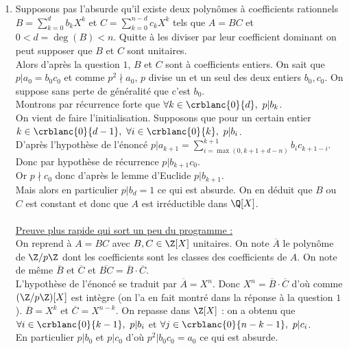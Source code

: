 \documentclass{book}
\begin{document}
\begin{enumerate}[leftmargin=*]
\begin{enumerate}[label=\alph*.]
			On sait que $\tilde P\tilde Q=\displaystyle\frac{a}{c(aP)}\cdot\frac{b}{c(bQ)}S$. On remarque que le contenu de $S$ vaut $1$ car il est unitaire. Donc en passant au contenu, $\displaystyle 1=c(\tilde P)c(\tilde Q)=\frac{a}{c(aP)}\cdot\frac{b}{c(bQ)}$. De plus $\displaystyle\frac{a}{c(aP)}$ et $\displaystyle\frac{b}{c(bQ)}$ sont des entiers. Ils valent donc tous les deux $\pm1$. Ainsi $P=\pm\tilde P\in \Z[X]$ et $Q=\pm\tilde Q\in \Z[X]$.
		\end{enumerate}
		\item Supposons pas l'absurde qu'il existe deux polynômes à coefficients rationnels $B=\displaystyle\sum_{k=0}^db_kX^k$ et $C=\displaystyle\sum_{k=0}^{n-d}c_kX^k$ tels que $A=BC$ et $0<d=\deg(B)<n$. Quitte à les diviser par leur coefficient dominant on peut supposer que $B$ et $C$ sont unitaires.\\
		Alors d'après la question $1$, $B$ et $C$ sont à coefficients entiers.
		On sait que $p|a_0=b_0c_0$ et comme $p^2\nmid a_0$, $p$ divise un et un seul des deux entiers $b_0,c_0$. On suppose sans perte de généralité que c'est $b_0$.\\
		Montrons par récurrence forte que $\forall k\in \crblanc{0}{d},\ p|b_k$.\\
		On vient de faire l'initialisation. Supposons que pour un certain entier $k\in \crblanc{0}{d-1},\ \forall i\in \crblanc{0}{k},\ p|b_i$.\\
		D'après l'hypothèse de l'énoncé $p|a_{k+1}=\displaystyle\sum_{i=\max(0,k+1+d-n)}^{k+1}b_ic_{k+1-i}$. Donc par hypothèse de récurrence $p|b_{k+1}c_0$.\\
		Or $p\nmid c_0$ donc d'après le lemme d'Euclide $p|b_{k+1}$.\\
		Mais alors en particulier $p|b_d=1$ ce qui est absurde. On en déduit que $B$ ou $C$ est constant et donc que $A$ est irréductible dans $\Q[X]$.\\\\
		\underline{Preuve plus rapide qui sort un peu du programme :}\\
		On reprend à $A=BC$ avec $B,C\in \Z[X]$ unitaires. On note $\overline A$ le polynôme de $\Z/p\Z$ dont les coefficients sont les classes des coefficients de $A$. On note de même $\overline B$ et $\overline C$ et $\overline{BC}=\overline B\cdot\overline C$.\\
		L'hypothèse de l'énoncé se traduit par $\overline A=X^n$. Donc $X^n=\overline B\cdot\overline C$ d'où comme $(\Z/p\Z)[X]$ est intègre (on l'a en fait montré dans la réponse à la question $1$). $\overline B=X^k$ et $\overline C=X^{n-k}$. On repasse dans $\Z[X]$ : on a obtenu que $\forall i\in \crblanc{0}{k-1},\ p|b_i$ et $\forall j\in \crblanc{0}{n-k-1},\ p|c_i$.\\
		En particulier $p|b_0$ et $p|c_0$ d'où $p^2|b_0c_0=a_0$ ce qui est absurde.
	\end{enumerate}
	
\end{document}
